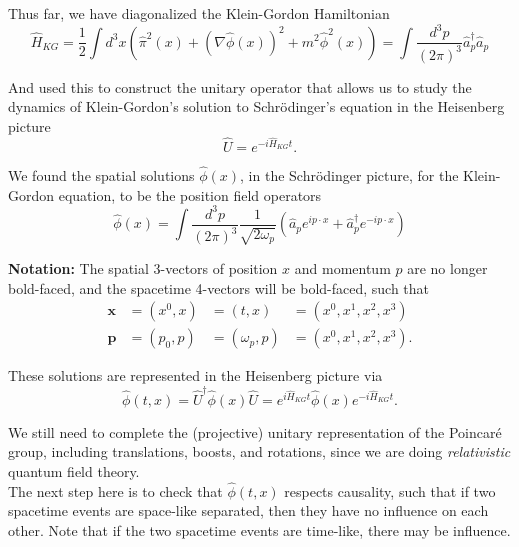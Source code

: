 \noindent Thus far, we have diagonalized the Klein-Gordon Hamiltonian
\begin{equation}
\hat{H}_{KG} = \frac{1}{2} \int d^3 x \left( \hat{\pi}^2 (x) + (\nabla \hat{\phi}(x))^2 + m^2 \hat{\phi}^2(x) \right) = \int \frac{d^3 p}{(2\pi)^3} \hat{a}_p^\dagger \hat{a}_p
\end{equation}

\noindent And used this to construct the unitary operator that allows us to study the dynamics of Klein-Gordon's solution to Schr\"odinger's equation in the Heisenberg picture
\begin{equation}
\hat{U} = e^{-i\hat{H}_{KG} t}.
\end{equation}

\noindent We found the spatial solutions $\hat{\phi}(x)$, in the Schr\"odinger picture, for the Klein-Gordon equation, to be the position field operators
\begin{equation}
\hat{\phi} (x) = \int \frac{d^3 p}{(2\pi)^3} \frac{1}{\sqrt{2 \omega_p}} \left( \hat{a}_p e^{i p \cdot x} + \hat{a}_p^\dagger e^{-i p \cdot x} \right)
\end{equation}

\noindent \textbf{Notation:} The spatial 3-vectors of position $x$ and momentum $p$ are no longer bold-faced, and the spacetime 4-vectors will be bold-faced, such that 
\begin{align}
\textbf{x} &= (x^0, x) &= (t,x) &= (x^0, x^1, x^2, x^3) \\
\textbf{p} &= (p_0, p) &= (\omega_p, p) &= (x^0, x^1, x^2, x^3) .
\end{align}

\noindent These solutions are represented in the Heisenberg picture via
\begin{equation}
\hat{\phi}(t, x) = \hat{U}^\dagger \hat{\phi}(x) \hat{U} = e^{i \hat{H}_{KG} t} \hat{\phi}(x) e^{-i \hat{H}_{KG} t}.
\end{equation}

\noindent We still need to complete the (projective) unitary representation of the Poincar\'e group, including translations, boosts, and rotations, since we are doing \textit{relativistic} quantum field theory.  \\

\noindent The next step here is to check that $\hat{\phi}(t,x)$ respects causality, such that if two spacetime events are space-like separated, then they have no influence on each other. Note that if the two spacetime events are time-like, there may be influence. \\

